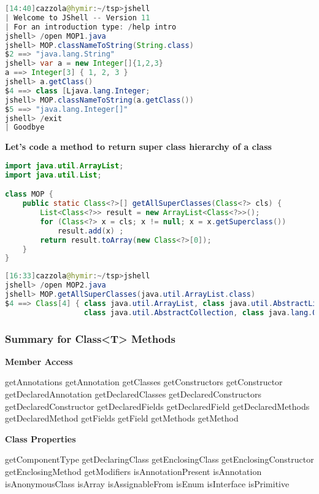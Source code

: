 \begin{lstlisting}[language=Java]
[14:40]cazzola@hymir:~/tsp>jshell
| Welcome to JShell -- Version 11
| For an introduction type: /help intro
jshell> /open MOP1.java
jshell> MOP.classNameToString(String.class)
$2 ==> "java.lang.String"
jshell> var a = new Integer[]{1,2,3}
a ==> Integer[3] { 1, 2, 3 }
jshell> a.getClass()
$4 ==> class [Ljava.lang.Integer;
jshell> MOP.classNameToString(a.getClass())
$5 ==> "java.lang.Integer[]"
jshell> /exit
| Goodbye
\end{lstlisting}

\textbf{Let’s code a method to return super class hierarchy of a class}

\begin{lstlisting}[language=Java]
import java.util.ArrayList;
import java.util.List;

class MOP {
	public static Class<?>[] getAllSuperClasses(Class<?> cls) {
		List<Class<?>> result = new ArrayList<Class<?>>();
		for (Class<?> x = cls; x != null; x = x.getSuperclass())
			result.add(x) ;
		return result.toArray(new Class<?>[0]);
	}
}
\end{lstlisting}

\begin{lstlisting}[language=Java]
[16:33]cazzola@hymir:~/tsp>jshell
jshell> /open MOP2.java
jshell> MOP.getAllSuperClasses(java.util.ArrayList.class)
$4 ==> Class[4] { class java.util.ArrayList, class java.util.AbstractList,
                  class java.util.AbstractCollection, class java.lang.Object }
\end{lstlisting}

\subsubsection{Summary for Class<T> Methods}

\textbf{Member Access}

getAnnotations
getAnnotation
getClasses
getConstructors
getConstructor
getDeclaredAnnotation
getDeclaredClasses
getDeclaredConstructors
getDeclaredConstructor
getDeclaredFields
getDeclaredField
getDeclaredMethods
getDeclaredMethod
getFields
getField
getMethods
getMethod

\textbf{Class Properties}

getComponentType
getDeclaringClass
getEnclosingClass
getEnclosingConstructor
getEnclosingMethod
getModifiers
isAnnotationPresent
isAnnotation
isAnonymousClass
isArray
isAssignableFrom
isEnum
isInterface
isPrimitive

